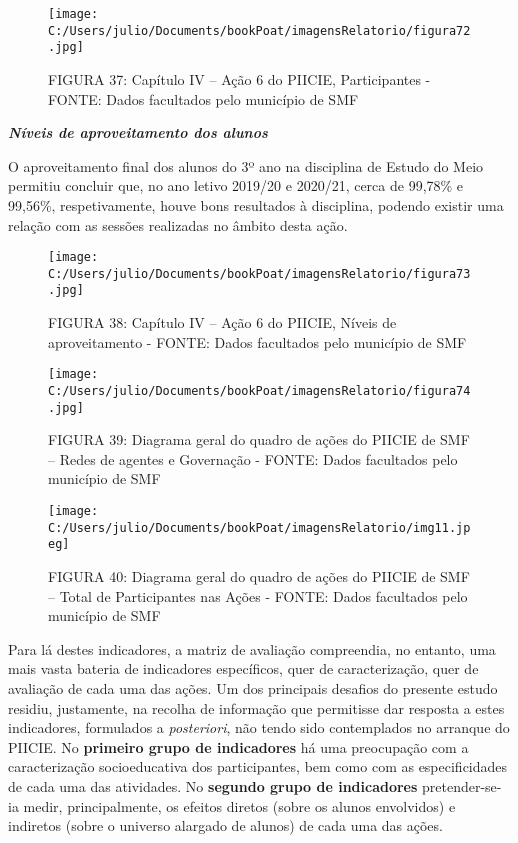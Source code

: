\documentclass[
]{book}
\begin{document}
\begin{figure}
\centering
\texttt{[image: C:/Users/julio/Documents/bookPoat/imagensRelatorio/figura72.jpg]}
\caption{FIGURA 37: Capítulo IV -- Ação 6 do PIICIE, Participantes - FONTE: Dados facultados pelo município de SMF}
\end{figure}

\textbf{\emph{Níveis de aproveitamento dos alunos}}

O aproveitamento final dos alunos do 3º ano na disciplina de Estudo do Meio permitiu concluir que, no ano letivo 2019/20 e 2020/21, cerca de 99,78\% e 99,56\%, respetivamente, houve bons resultados à disciplina, podendo existir uma relação com as sessões realizadas no âmbito desta ação.

\begin{figure}
\centering
\texttt{[image: C:/Users/julio/Documents/bookPoat/imagensRelatorio/figura73.jpg]}
\caption{FIGURA 38: Capítulo IV -- Ação 6 do PIICIE, Níveis de aproveitamento - FONTE: Dados facultados pelo município de SMF}
\end{figure}

\begin{figure}
\centering
\texttt{[image: C:/Users/julio/Documents/bookPoat/imagensRelatorio/figura74.jpg]}
\caption{FIGURA 39: Diagrama geral do quadro de ações do PIICIE de SMF -- Redes de agentes e Governação - FONTE: Dados facultados pelo município de SMF}
\end{figure}

\begin{figure}
\centering
\texttt{[image: C:/Users/julio/Documents/bookPoat/imagensRelatorio/img11.jpeg]}
\caption{FIGURA 40: Diagrama geral do quadro de ações do PIICIE de SMF -- Total de Participantes nas Ações - FONTE: Dados facultados pelo município de SMF}
\end{figure}

Para lá destes indicadores, a matriz de avaliação compreendia, no entanto, uma mais vasta bateria de indicadores específicos, quer de caracterização, quer de avaliação de cada uma das ações. Um dos principais desafios do presente estudo residiu, justamente, na recolha de informação que permitisse dar resposta a estes indicadores, formulados a \emph{posteriori}, não tendo sido contemplados no arranque do PIICIE. No \textbf{primeiro grupo de indicadores} há uma preocupação com a caracterização socioeducativa dos participantes, bem como com as especificidades de cada uma das atividades. No \textbf{segundo grupo de indicadores} pretender-se-ia medir, principalmente, os efeitos diretos (sobre os alunos envolvidos) e indiretos (sobre o universo alargado de alunos) de cada uma das ações.
\end{document}
